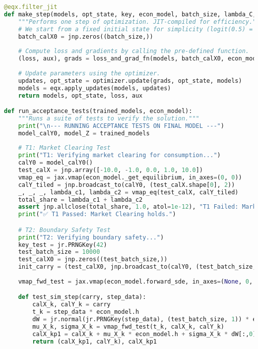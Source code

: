 \documentclass[11pt,letterpaper,oneside]{article}
\theoremstyle{plain}
\theoremstyle{definition}
\theoremstyle{remark}
\begin{document}
\begin{lstlisting}[language=Python, caption={C.5: Training Loop, JIT-compiled Step, and Acceptance Tests.}, label={lst:jax_training_app_appendix}]
@eqx.filter_jit
def make_step(models, opt_state, key, econ_model, batch_size, lambda_C, optimizer):
    """Performs one step of optimization. JIT-compiled for efficiency."""
    # We start from a fixed initial state for simplicity (logit(0.5) = 0).
    batch_calX0 = jnp.zeros((batch_size,))
    
    # Compute loss and gradients by calling the pre-defined function.
    (loss, aux), grads = loss_and_grad_fn(models, batch_calX0, econ_model, key, lambda_C)
    
    # Update parameters using the optimizer.
    updates, opt_state = optimizer.update(grads, opt_state, models)
    models = eqx.apply_updates(models, updates)
    return models, opt_state, loss, aux

def run_acceptance_tests(trained_models, econ_model):
    """Runs a suite of tests to verify the solution."""
    print("\n--- RUNNING ACCEPTANCE TESTS ON FINAL MODEL ---")
    model_calY0, model_Z = trained_models
    
    # T1: Market Clearing Test
    print("T1: Verifying market clearing for consumption...")
    calY0 = model_calY0()
    test_calX = jnp.array([-10.0, -1.0, 0.0, 1.0, 10.0])
    vmap_eq = jax.vmap(econ_model._get_equilibrium, in_axes=(0, 0))
    calY_tiled = jnp.broadcast_to(calY0, (test_calX.shape[0], 2))
    _, _, _, lambda_c1, lambda_c2 = vmap_eq(test_calX, calY_tiled)
    total_share = lambda_c1 + lambda_c2
    assert jnp.allclose(total_share, 1.0, atol=1e-12), "T1 Failed: Market clearing!"
    print("✅ T1 Passed: Market Clearing holds.")

    # T2: Boundary Safety Test
    print("T2: Verifying boundary safety...")
    key_test = jr.PRNGKey(42)
    test_batch_size = 10000
    test_calX0 = jnp.zeros((test_batch_size,))
    init_carry = (test_calX0, jnp.broadcast_to(calY0, (test_batch_size, 2)))
    
    vmap_fwd_test = jax.vmap(econ_model.forward_sde, in_axes=(None, 0, 0))

    def test_sim_step(carry, step_data):
        calX_k, calY_k = carry
        t_k = step_data * econ_model.h
        dW = jr.normal(jr.PRNGKey(step_data), (test_batch_size, 1)) * econ_model.sqrt_h
        mu_X_k, sigma_X_k = vmap_fwd_test(t_k, calX_k, calY_k)
        calX_kp1 = calX_k + mu_X_k * econ_model.h + sigma_X_k * dW[:,0]
        return (calX_kp1, calY_k), calX_kp1


\end{lstlisting}
\end{document}
